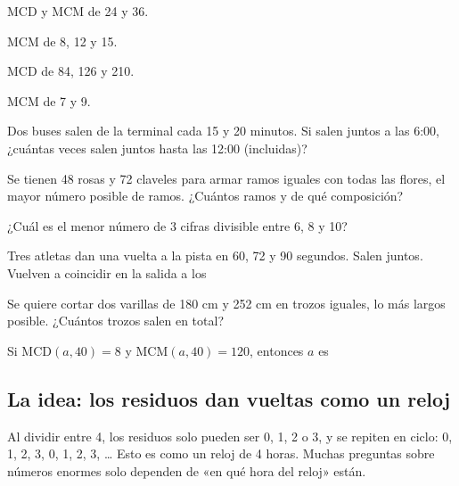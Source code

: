 \taller
{}
\begin{ejercicios}[2]
\item MCD y MCM de 24 y 36. 
\item MCM de 8, 12 y 15. 
\item MCD de 84, 126 y 210. 
\item MCM de 7 y 9. 
\end{ejercicios}
\begin{ejercicios}
\item Dos buses salen de la terminal cada 15 y 20 minutos. Si salen juntos a las 6:00, ¿cuántas veces salen juntos hasta las 12:00 (incluidas)? 
\item Se tienen 48 rosas y 72 claveles para armar ramos iguales con todas las flores, el mayor número posible de ramos. ¿Cuántos ramos y de qué composición? 
\item ¿Cuál es el menor número de 3 cifras divisible entre 6, 8 y 10? 
\end{ejercicios}
\begin{ejercicios}
\item Tres atletas dan una vuelta a la pista en 60, 72 y 90 segundos. Salen juntos. Vuelven a coincidir en la salida a los
\item Se quiere cortar dos varillas de 180 cm y 252 cm en trozos iguales, lo más largos posible. ¿Cuántos trozos salen en total?
\item Si $\text{MCD}(a, 40) = 8$ y $\text{MCM}(a, 40) = 120$, entonces $a$ es
\end{ejercicios}

\bitacora


\subsection{La idea: los residuos dan vueltas como un reloj}
Al dividir entre 4, los residuos solo pueden ser 0, 1, 2 o 3, y se repiten en ciclo: 0, 1, 2, 3, 0, 1, 2, 3, … Esto es
como un reloj de 4 horas. Muchas preguntas sobre números enormes solo dependen de «en qué hora del reloj» están.

